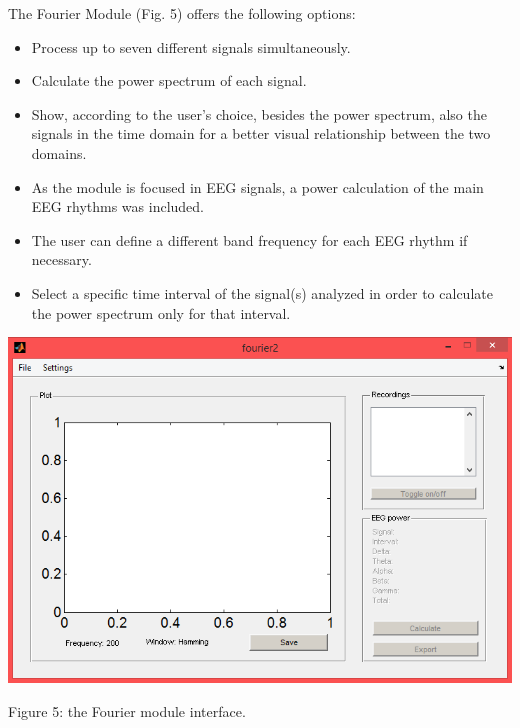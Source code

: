 \documentclass[12pt, a4paper]{article}
\begin{document}
The Fourier Module (Fig. 5) offers the following options:
\begin{itemize}
\item Process up to seven different signals simultaneously.
\item Calculate the power spectrum of each signal.
\item Show, according to the user’s choice, besides the power spectrum, also the signals in the time domain for a better visual relationship between the two domains.
\item As the module is focused in EEG signals, a power calculation of the main EEG rhythms was included.
\item The user can define a different band frequency for each EEG rhythm if necessary.
\item Select a specific time interval of the signal(s) analyzed in order to calculate the power spectrum only for that interval.
\end{itemize}
\begin{center}
\includegraphics[width=15cm]{fourier.png}

Figure 5: the Fourier module interface.
\end{center}
\end{document}
